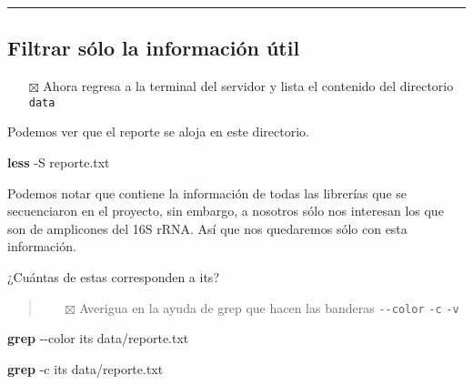 \documentclass[
]{book}
\newenvironment{Shaded}{\begin{snugshade}}{\end{snugshade}}
\newcommand{\AttributeTok}[1]{\textcolor[rgb]{0.13,0.29,0.53}{#1}}
\newcommand{\FunctionTok}[1]{\textcolor[rgb]{0.13,0.29,0.53}{\textbf{#1}}}
\newcommand{\NormalTok}[1]{#1}
\newcommand{\StringTok}[1]{\textcolor[rgb]{0.31,0.60,0.02}{#1}}
\providecommand{\tightlist}{%
  \setlength{\itemsep}{0pt}\setlength{\parskip}{0pt}}
\begin{document}
\begin{center}\rule{0.5\linewidth}{0.5pt}\end{center}

\subsection{Filtrar sólo la información útil}\label{filtrar-suxf3lo-la-informaciuxf3n-uxfatil}

\begin{itemize}
\tightlist
\item[$\boxtimes$]
  Ahora regresa a la terminal del servidor y lista el contenido del directorio \texttt{data}
\end{itemize}

Podemos ver que el reporte se aloja en este directorio.

\begin{Shaded}
\begin{Highlighting}[]
\FunctionTok{less} \AttributeTok{{-}S}\NormalTok{ reporte.txt}
\end{Highlighting}
\end{Shaded}

Podemos notar que contiene la información de todas las librerías que se secuenciaron en el proyecto, sin embargo, a nosotros sólo nos interesan los que son de amplicones del 16S rRNA. Así que nos quedaremos sólo con esta información.

¿Cuántas de estas corresponden a its?

\begin{quote}
\begin{itemize}
\tightlist
\item[$\boxtimes$]
  Averigua en la ayuda de grep que hacen las banderas \texttt{-\/-color} \texttt{-c} \texttt{-v}
\end{itemize}
\end{quote}

\begin{Shaded}
\begin{Highlighting}[]
\FunctionTok{grep} \AttributeTok{{-}{-}color} \StringTok{\textquotesingle{}its\textquotesingle{}}\NormalTok{ data/reporte.txt}
\end{Highlighting}
\end{Shaded}

\begin{Shaded}
\begin{Highlighting}[]
\FunctionTok{grep} \AttributeTok{{-}c} \StringTok{\textquotesingle{}its\textquotesingle{}}\NormalTok{ data/reporte.txt}
\end{Highlighting}
\end{Shaded}
\end{document}
